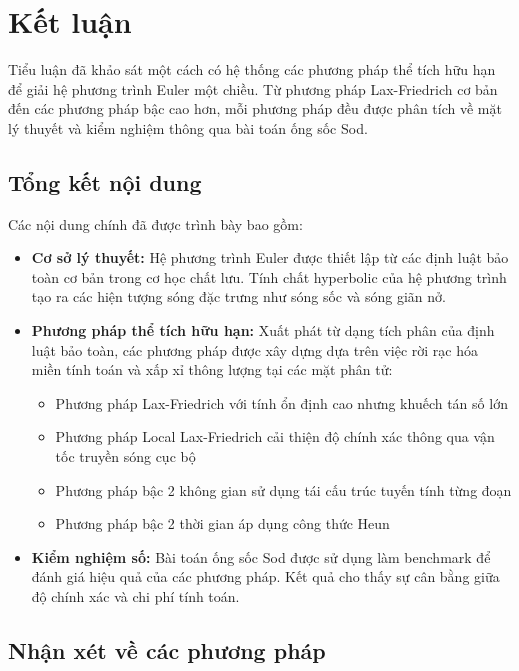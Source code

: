 \chapter*{Kết luận}

Tiểu luận đã khảo sát một cách có hệ thống các phương pháp thể tích hữu hạn để giải hệ phương trình Euler một chiều. Từ phương pháp Lax-Friedrich cơ bản đến các phương pháp bậc cao hơn, mỗi phương pháp đều được phân tích về mặt lý thuyết và kiểm nghiệm thông qua bài toán ống sốc Sod.

\section*{Tổng kết nội dung}

Các nội dung chính đã được trình bày bao gồm:

\begin{itemize}
    \item \textbf{Cơ sở lý thuyết:} Hệ phương trình Euler được thiết lập từ các định luật bảo toàn cơ bản trong cơ học chất lưu. Tính chất hyperbolic của hệ phương trình tạo ra các hiện tượng sóng đặc trưng như sóng sốc và sóng giãn nở.
    
    \item \textbf{Phương pháp thể tích hữu hạn:} Xuất phát từ dạng tích phân của định luật bảo toàn, các phương pháp được xây dựng dựa trên việc rời rạc hóa miền tính toán và xấp xỉ thông lượng tại các mặt phân tử:
    \begin{itemize}
        \item Phương pháp Lax-Friedrich với tính ổn định cao nhưng khuếch tán số lớn
        \item Phương pháp Local Lax-Friedrich cải thiện độ chính xác thông qua vận tốc truyền sóng cục bộ
        \item Phương pháp bậc 2 không gian sử dụng tái cấu trúc tuyến tính từng đoạn
        \item Phương pháp bậc 2 thời gian áp dụng công thức Heun
    \end{itemize}
    
    \item \textbf{Kiểm nghiệm số:} Bài toán ống sốc Sod được sử dụng làm benchmark để đánh giá hiệu quả của các phương pháp. Kết quả cho thấy sự cân bằng giữa độ chính xác và chi phí tính toán.
\end{itemize}

\section*{Nhận xét về các phương pháp}

